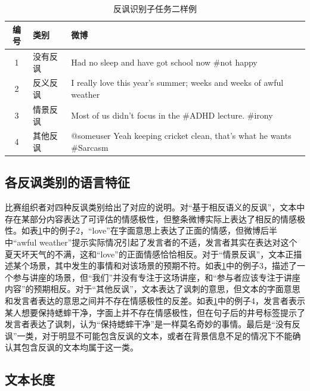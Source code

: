 \begin{table}[htb]
  \centering
  \begin{minipage}[t]{\linewidth} %
  \caption{反讽识别子任务二样例}
  \label{tab:semeval_2018_task3_B_sample}
  \begin{tabularx}{\linewidth}{c|l|X}
    \toprule[1.5pt]
    编号 & 类别 & 微博 \\
    \hline
    1 & 没有反讽 & Had no sleep and have got school now \#not happy \\
    2 & 反义反讽 & I really love this year’s summer; weeks and weeks of awful weather \\
    3 & 情景反讽 & Most of us didn’t focus in the \#ADHD lecture. \#irony \\
    4 & 其他反讽 & @someuser Yeah keeping cricket clean, that's what he wants \#Sarcasm \\
    \bottomrule[1.5pt]
  \end{tabularx}
  \end{minipage}
\end{table}

\subsection{各反讽类别的语言特征}

比赛组织者对四种反讽类别给出了对应的说明。对“基于相反语义的反讽”，文本中存在某部分内容表达了可评估的情感极性，但整条微博实际上表达了相反的情感极性。如表\ref{tab:semeval_2018_task3_B_sample}中的例子2，“love”在字面意思上表达了正面的情感，但微博后半中“awful weather”提示实际情况引起了发言者的不适，发言者其实在表达对这个夏天坏天气的不满，这和“love”的正面情感恰恰相反。对于“情景反讽”，文本正描述某个场景，其中发生的事情和对该场景的预期不符。如表\ref{tab:semeval_2018_task3_B_sample}中的例子3，描述了一个参与讲座的场景，但“我们”并没有专注于这场讲座，和“参与者应该专注于讲座内容”的预期相反。对于“其他反讽”，文本表达了讽刺的意思，但文本的字面意思和发言者表达的意思之间并不存在情感极性的反差。如表\ref{tab:semeval_2018_task3_B_sample}中的例子4，发言者表示某人想要保持蟋蟀干净，字面上并不存在情感极性，但在句子后的井号标签提示了发言者表达了讽刺，认为“保持蟋蟀干净”是一样莫名奇妙的事情。最后是“没有反讽”一类，对于明显不可能包含反讽的文本，或者在背景信息不足的情况下不能确认其包含反讽的文本均属于这一类。

\subsection{文本长度}

